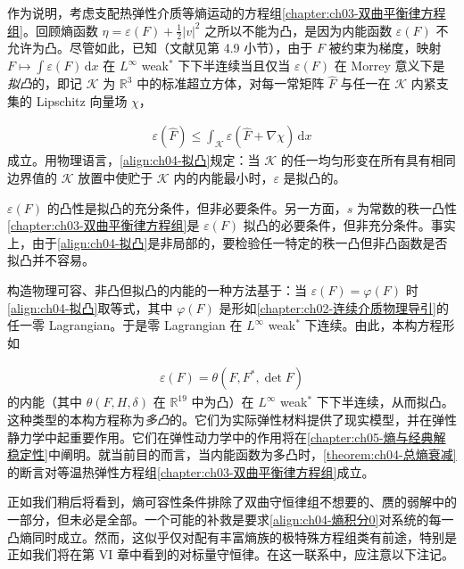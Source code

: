 \documentclass[../../main.tex]{subfiles}
\begin{document}
作为说明，考虑支配热弹性介质等熵运动的方程组\cref{chapter:ch03-双曲平衡律方程组}。回顾熵函数 $\eta=\varepsilon(F)+\tfrac{1}{2}|v|^{2}$ 之所以不能为凸，是因为内能函数 $\varepsilon(F)$ 不允许为凸。尽管如此，已知（文献见第 4.9 小节），由于 $F$ 被约束为梯度，映射 $F\mapsto\int\varepsilon(F)\,\mathrm{d}x$ 在 $L^{\infty}$ weak$^{*}$ 下下半连续当且仅当 $\varepsilon(F)$ 在 Morrey 意义下是\emph{拟凸}的，即记 $\mathscr{K}$ 为 $\mathbb{R}^{3}$ 中的标准超立方体，对每一常矩阵 $\hat{F}$ 与任一在 $\mathscr{K}$ 内紧支集的 Lipschitz 向量场 $\chi$，

\begin{align}
\varepsilon(\hat{F})\leqslant\int_{\mathscr{K}}\varepsilon(\hat{F}+\nabla\chi)\,\mathrm{d}x
\label{align:ch04-拟凸}
\end{align}
成立。用物理语言，\eqref{align:ch04-拟凸}规定：当 $\mathscr{K}$ 的任一均匀形变在所有具有相同边界值的 $\mathscr{K}$ 放置中使贮于 $\mathscr{K}$ 内的内能最小时，$\varepsilon$ 是拟凸的。

$\varepsilon(F)$ 的凸性是拟凸的充分条件，但非必要条件。另一方面，$s$ 为常数的秩一凸性\cref{chapter:ch03-双曲平衡律方程组}是 $\varepsilon(F)$ 拟凸的必要条件，但非充分条件。事实上，由于\eqref{align:ch04-拟凸}是非局部的，要检验任一特定的秩一凸但非凸函数是否拟凸并不容易。


构造物理可容、非凸但拟凸的内能的一种方法基于：当 $\varepsilon(F)=\varphi(F)$ 时\eqref{align:ch04-拟凸}取等式，其中 $\varphi(F)$ 是形如\cref{chapter:ch02-连续介质物理导引}的任一零 Lagrangian。于是零 Lagrangian 在 $L^{\infty}$ weak$^{*}$ 下连续。由此，本构方程形如

\begin{align}
\varepsilon(F)=\theta(F,F^{*},\det F)
\label{align:ch04-多凸}
\end{align}
的内能（其中 $\theta(F,H,\delta)$ 在 $\mathbb{R}^{19}$ 中为凸）在 $L^{\infty}$ weak$^{*}$ 下下半连续，从而拟凸。这种类型的本构方程称为\emph{多凸}的。它们为实际弹性材料提供了现实模型，并在弹性静力学中起重要作用。它们在弹性动力学中的作用将在\cref{chapter:ch05-熵与经典解稳定性}中阐明。就当前目的而言，当内能函数为多凸时，\cref{theorem:ch04-总熵衰减}的断言对等温热弹性方程组\cref{chapter:ch03-双曲平衡律方程组}成立。


正如我们稍后将看到，熵可容性条件排除了双曲守恒律组不想要的、赝的弱解中的一部分，但未必是全部。一个可能的补救是要求\eqref{align:ch04-熵积分0}对系统的每一凸熵同时成立。然而，这似乎仅对配有丰富熵族的极特殊方程组类有前途，特别是正如我们将在第 VI 章中看到的对标量守恒律。在这一联系中，应注意以下注记。
\end{document}
